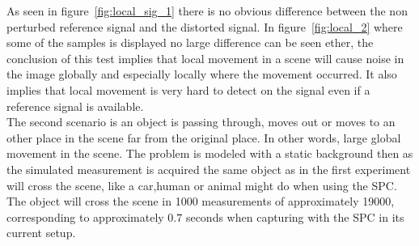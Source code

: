 As seen in figure~\ref{fig:local_sig_1} there is no obvious difference between the non perturbed reference signal and the distorted signal. In figure~\ref{fig:local_2} where some of the samples is displayed no large difference can be seen ether, the conclusion of this test implies that local movement in a scene will cause noise in the image globally and especially locally where the movement occurred. It also implies that local movement is very hard to detect on the signal even if a reference signal is available.\\[0.1in] 


The second scenario is an object is passing through, moves out or moves to an other place in the scene far from the original place. In other words, large global movement in the scene. The problem is modeled with a static background then as the simulated measurement is acquired the same object as in the first experiment will cross the scene, like a car,human or animal might do when using the SPC. The object will cross the scene in 1000 measurements of approximately 19000, corresponding to approximately $0.7$ seconds when capturing with the SPC in its current setup.



